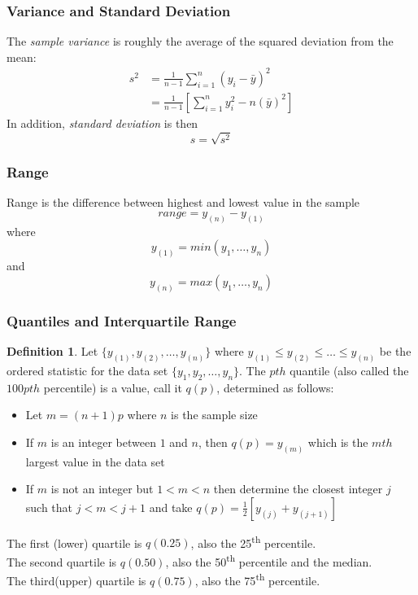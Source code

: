 \documentclass[12pt, leqno]{article}
\theoremstyle{definition}
\newtheorem*{defn}{Definition}
\begin{document}
  \subsubsection{Variance and Standard Deviation}
  The \emph{sample variance} is roughly the average of the squared deviation from the mean:
  \begin{align*}
  s^{2} &= \frac{1}{n-1}\sum_{i=1}^{n}(y_{i} - \bar{y})^{2} \\
  &= \frac{1}{n-1}
  \left[
  \sum_{i=1}^{n}y_{i}^{2} - n(\bar{y})^{2}
  \right]
  \end{align*}
  In addition, \emph{standard deviation} is then
  $$s = \sqrt{s^{2}}$$
  \subsubsection{Range}
  Range is the difference between highest and lowest value in the sample
  $$range = y_{(n)} - y_{(1)}$$
  where
  $$y_{(1)} = min(y_{1}, \dots, y_{n})$$
  and
  $$y_{(n)} = max(y_{1}, \dots, y_{n})$$
  \subsubsection{Quantiles and Interquartile Range} \label{iqr}
  \begin{defn}
    Let $\{y_{(1)}, y_{(2)}, \dots, y_{(n)}\}$ where $y_{(1)} \leq y_{(2)} \leq \dots \leq y_{(n)}$ be the ordered statistic for the data set $\{y_1, y_2, \dots, y_n\}$.
    The $pth$ quantile (also called the $100pth$ percentile) is a value, call it $q(p)$, determined as follows:
    \begin{itemize}
    \item Let $m = (n+1)p$ where $n$ is the sample size
    \item If $m$ is an integer between $1$ and $n$, then $q(p) = y_{(m)}$ which is the $mth$ largest value in the data set
    \item If $m$ is not an integer but $1 < m < n$ then determine the closest integer $j$ such that $j < m < j+1$ and take $q(p) = \frac{1}{2}[y_{(j)} + y_{(j+1)}]$
    \end{itemize}
  \end{defn}
  The first (lower) quartile is $q(0.25)$, also the 25\textsuperscript{th} percentile. \\
  The second quartile is $q(0.50)$, also the 50\textsuperscript{th} percentile and the median. \\
  The third(upper) quartile is $q(0.75)$, also the 75\textsuperscript{th} percentile. \\
\end{document}
